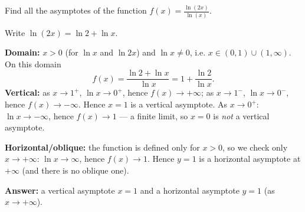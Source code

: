 
\begin{question}
Find all the asymptotes of the function $f(x)=\frac{\ln(2x)}{\ln(x)}$.
\end{question}

\begin{hint}
Write $\ln(2x)=\ln2+\ln x$.
\end{hint}

\begin{solution}
\textbf{Domain:} $x>0$ (for $\ln x$ and $\ln 2x$) and $\ln x\neq0$, i.e. $x\in(0,1)\cup(1,\infty)$. On this domain
\[
f(x)=\frac{\ln2+\ln x}{\ln x}=1+\frac{\ln2}{\ln x}.
\]
\textbf{Vertical:} as $x\to1^+$, $\ln x\to0^+$, hence $f(x)\to+\infty$; as $x\to1^-$, $\ln x\to0^-$, hence $f(x)\to-\infty$. Hence $x=1$ is a vertical asymptote.
As $x\to0^+$: $\ln x\to-\infty$, hence $f(x)\to1$ — a finite limit, so $x=0$ is \emph{not} a vertical asymptote.

\textbf{Horizontal/oblique:} the function is defined only for $x>0$, so we check only $x\to+\infty$: $\ln x\to\infty$, hence $f(x)\to1$. Hence $y=1$ is a horizontal asymptote at $+\infty$ (and there is no oblique one).

\textbf{Answer:} a vertical asymptote $x=1$ and a horizontal asymptote $y=1$ (as $x\to+\infty$).
\end{solution}
